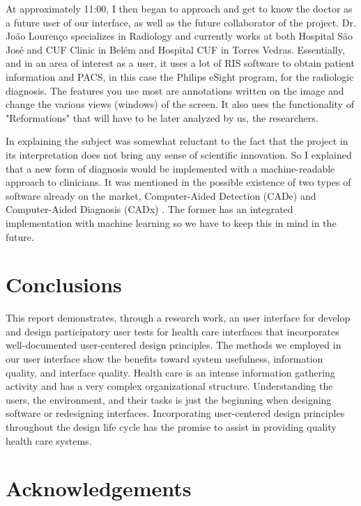 At approximately 11:00, I then began to approach and get to know the doctor as a future user of our interface, as well as the future collaborator of the project. Dr. Jo\~{a}o Louren\c{c}o \cite{joaoLourenco} specializes in Radiology and currently works at both Hospital S\~{a}o Jos\'{e} and CUF Clinic in Bel\'{e}m and Hospital CUF in Torres Vedras. Essentially, and in an area of ​​interest as a user, it uses a lot of RIS software to obtain patient information and PACS, in this case the Philips eSight program, for the radiologic diagnosis. The features you use most are annotations written on the image and change the various views (windows) of the screen. It also uses the functionality of "Reformations" that will have to be later analyzed by us, the researchers.

In explaining the subject was somewhat reluctant to the fact that the project in its interpretation does not bring any sense of scientific innovation. So I explained that a new form of diagnosis would be implemented with a machine-readable approach to clinicians. It was mentioned in the possible existence of two types of software already on the market, Computer-Aided Detection (CADe) and Computer-Aided Diagnosis (CADx) \cite{computerAidedDiagnosis}. The former has an integrated implementation with machine learning so we have to keep this in mind in the future.

\clearpage

\section{Conclusions}

This report demonstrates, through a research work, an user interface for develop and design participatory user tests for health care interfaces that incorporates well-documented user-centered design principles.  The methods we employed in our user interface show the benefits toward system usefulness, information quality, and interface quality. Health care is an intense information gathering activity and has a very complex organizational structure. Understanding the users, the environment, and their tasks is just the beginning when designing software or redesigning interfaces. Incorporating user-centered design principles throughout the design life cycle has the promise to assist in providing quality health care systems.

\clearpage

\section{Acknowledgements}

